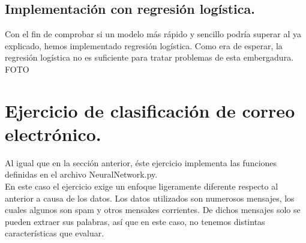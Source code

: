 \documentclass[a4paper,10pt]{article}
\begin{document}
\subsection{Implementación con regresión logística.}
Con el fin de comprobar si un modelo más rápido y sencillo podría superar al ya explicado, hemos implementado regresión logística. Como era de esperar, la regresión logística no es suficiente para tratar problemas de esta embergadura.
FOTO
\newpage
\section{Ejercicio de clasificación de correo electrónico.}
Al igual que en la sección anterior, éste ejercicio implementa las funciones definidas en el archivo NeuralNetwork.py.\\ En este caso el ejercicio exige un enfoque ligeramente diferente respecto al anterior a causa de los datos. Los datos utilizados son numerosos mensajes, los cuales algunos son spam y otros mensakes corrientes. De dichos mensajes solo se pueden extraer sus palabras, así que en este caso, no tenemos distintas características que evaluar.
\end{document}
